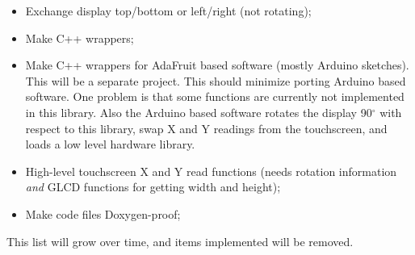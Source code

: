 \documentclass[12pt]{article}
\begin{document}
\begin{itemize}
\item Exchange display top/bottom or left/right (not rotating);
\item Make C++ wrappers;
\item Make C++ wrappers for AdaFruit based software (mostly Arduino sketches). This will be a separate project. This should minimize porting Arduino based software. One problem is that some functions are currently not implemented in this library. Also the Arduino based software rotates the display 90$^\circ$ with respect to this library, swap X and Y readings from the touchscreen, and loads a low level hardware library.
\item High-level touchscreen X and Y read functions (needs rotation information \textsl{and} GLCD functions for getting width and height);
\item Make code files Doxygen-proof;
\end{itemize}

This list will grow over time, and items implemented will be removed.

{}

\printindex
\end{document}
